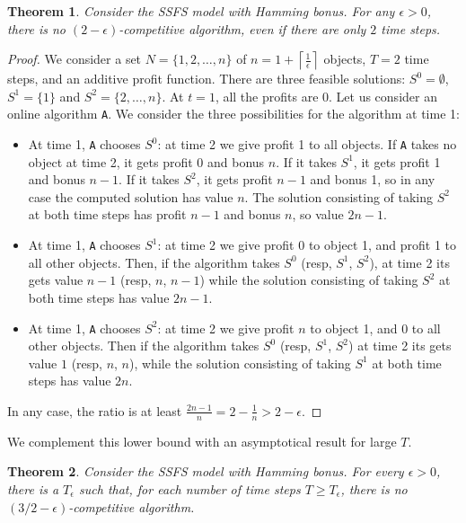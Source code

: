 \documentclass[a4paper]{book}
\newtheorem{theorem}{Theorem}[chapter]
\newtheorem{proof}{\noindent{\bf Proof.} }
\newcommand{\finalversion}[1]{#1}
\begin{document}
\begin{theorem}\label{thm:static-hamming-lower}
Consider the SSFS model with Hamming bonus. For any $\epsilon>0$, there is no $(2-\epsilon)$-competitive algorithm, even if there are only $2$ time steps. 
\end{theorem}

\begin{proof}
We consider a set $N=\{1,2,\dots,n\}$ of $n=1+\left\lceil \frac{1}{\epsilon}\right\rceil$ objects, $T=2$ time steps, \finalversion{and an additive profit function}. There are three feasible solutions: $S^0=\emptyset$, $S^1=\{1\}$ and $S^2=\{2,\dots,n\}$. At $t=1$, all the profits are 0. Let us consider an online algorithm \texttt{A}. We consider the three possibilities for the algorithm at time 1:
\begin{itemize}
\item At time 1, \texttt{A} chooses $S^0$: at time 2 we give profit 1 to all objects. If \texttt{A} takes no object at time 2, it gets profit 0 and bonus $n$. If it takes $S^1$, it gets profit 1 and bonus $n-1$. If it takes $S^2$, it gets profit $n-1$ and bonus 1, so in any case the computed solution has value $n$. The solution consisting of taking $S^2$ at both time steps has profit $n-1$ and bonus $n$, so value $2n-1$.
\item At time 1, \texttt{A} chooses $S^1$: at time 2 we give profit 0 to object 1, and profit 1 to all other objects. Then, if the algorithm takes $S^0$ (resp, $S^1$, $S^2$), at time 2 its gets value $n-1$ (resp, $n$, $n-1$) while the solution consisting of taking $S^2$ at both time steps has value $2n-1$.
\item At time 1, \texttt{A} chooses $S^2$: at time 2 we give profit $n$ to object 1, and 0 to all other objects. Then if the algorithm takes $S^0$ (resp, $S^1$, $S^2$) at time 2 its gets value \finalversion{$1$} (resp, $n$, $n$), while  the solution consisting of taking $S^1$ at both time steps has value $2n$.
\end{itemize}
In any case, the ratio is at least $\frac{2n-1}{n}=2-\frac{1}{n}>2-\epsilon$. %
\end{proof}

We complement this lower bound with an asymptotical result for large $T$.%

\begin{theorem}\label{th:lbmod1}
	Consider the SSFS model with Hamming bonus. For every $\epsilon>0$, there is a $T_\epsilon$ such that, for each number of time steps $T\geq T_\epsilon$, there is no $(3/2-\epsilon)$-competitive algorithm.
\end{theorem}
\end{document}
